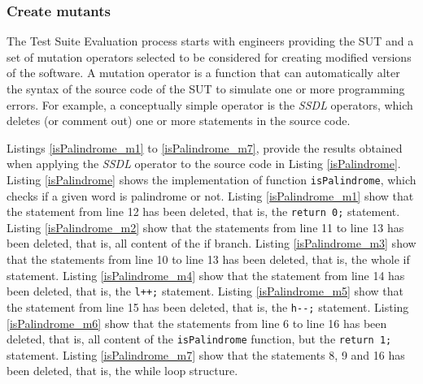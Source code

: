 \subsubsection{Create mutants}

The Test Suite Evaluation process starts with engineers providing the SUT and a set of mutation operators selected to be considered for creating modified versions of the software. 
A mutation operator is a function that can automatically alter the syntax of the source code of the SUT to simulate one or more programming errors.
For example, a conceptually simple operator is the \textit{SSDL} operators, which deletes (or comment out) one or more statements in the source code.



Listings \ref{isPalindrome_m1} to \ref{isPalindrome_m7}, provide the results obtained when applying the \textit{SSDL} operator to the source code in Listing \ref{isPalindrome}.
Listing \ref{isPalindrome} shows the implementation of function \texttt{isPalindrome}, which checks if a given word is palindrome or not.
Listing \ref{isPalindrome_m1} show that the statement from line 12 has been deleted, that is, the \texttt{return 0;} statement.
Listing \ref{isPalindrome_m2} show that the statements from line 11 to line 13 has been deleted, that is, all content of the if branch.
Listing \ref{isPalindrome_m3} show that the statements from line 10 to line 13 has been deleted, that is, the whole if statement.
Listing \ref{isPalindrome_m4} show that the statement from line 14 has been deleted, that is, the \texttt{l++;} statement.
Listing \ref{isPalindrome_m5} show that the statement from line 15 has been deleted, that is, the \texttt{h-}\texttt{-;} statement.
Listing \ref{isPalindrome_m6} show that the statements from line 6 to line 16 has been deleted, that is, all content of the \texttt{isPalindrome} function, but the \texttt{return 1;} statement.
Listing \ref{isPalindrome_m7} show that the statements 8, 9 and 16 has been deleted, that is, the while loop structure.











